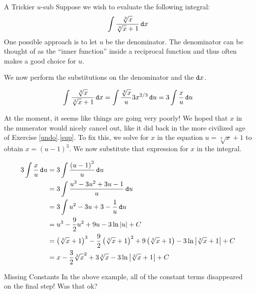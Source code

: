 \begin{example}{A Trickier $u$-sub}  Suppose we wish to evaluate the following integral:  $$ \int \frac{\sqrt[3]{x}}{\sqrt[3]{x}+1}\mathop{}\!\mathtt{d} x$$ One possible approach is to let $u$ be the denominator.  The denominator can be thought of as the ``inner function'' inside a reciprocal function and thus often makes a good choice for $u$.

We now perform the substitutions on the denominator and the $\mathop{}\!\mathtt{d} x$.

$$ \int \frac{\sqrt[3]{x}}{\sqrt[3]{x}+1}\mathop{}\!\mathtt{d} x= \int \frac{\sqrt[3]{x}}{u}3x^{2/3}\mathop{}\!\mathtt{d} u = 3 \int \frac{x}{u}\mathop{}\!\mathtt{d} u  $$

At the moment, it seems like things are going very poorly!  We hoped that $x$ in the numerator would nicely cancel out, like it did back in the more civilized age of Exercise \ref{undo}.\ref{sup}.  To fix this, we solve for $x$ in the equation $u=\sqrt[3]{x}+1$ to obtain $x=\left(u-1\right)^3$.  We now substitute that expression for $x$ in the integral.

\begin{align*}
3 \int \frac{x}{u}\mathop{}\!\mathtt{d} u & = 3 \int \frac{\left(u-1\right)^3}{u}\mathop{}\!\mathtt{d} u \\
& = 3 \int \frac{u^3-3u^2+3u-1}{u}\mathop{}\!\mathtt{d} u \\
& = 3 \int u^2-3u+3-\frac{1}{u} \mathop{}\!\mathtt{d} u \\
& = u^3-\frac{9}{2}u^2+9u-3\ln|u| + C \\
& = \left(\sqrt[3]{x}+1\right)^3-\frac{9}{2}\left(\sqrt[3]{x}+1\right)^2+9\left(\sqrt[3]{x}+1\right)-3\ln\left|\sqrt[3]{x}+1\right| + C \\
& = x-\frac{3}{2}\sqrt[3]{x}^2+3\sqrt[3]{x}-3\ln\left|\sqrt[3]{x}+1\right| + C \\
\end{align*}

\end{example}

\begin{exercise}{Missing Constants \Coffeecup }
In the above example, all of the constant terms disappeared on the final step!  Was that ok?  
\vspace{.2in}
\end{exercise}

